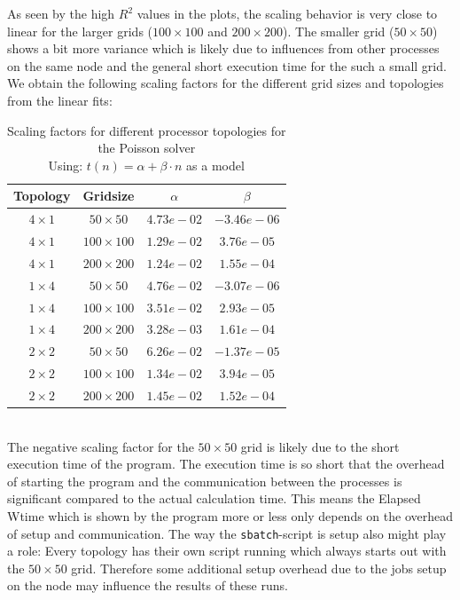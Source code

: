As seen by the high $R^2$ values in the plots, the scaling behavior is very close to linear for the larger grids ($100\times 100$ and $200\times 200$). The smaller grid ($50\times 50$) shows a bit more variance which is likely due to influences from other processes on the same node and the general short execution time for the such a small grid. 
We obtain the following scaling factors for the different grid sizes and topologies from the linear fits:
\begin{table}[H]
    \centering
    \begin{tabular}{|c|c|c|c|}
        \hline
        Topology & Gridsize & $\alpha$ & $\beta$ \\\hline
        $4\times 1$ & $50\times 50$   & $4.73e-02$ & $-3.46e-06$  \\ \hline
        $4\times 1$ & $100\times 100$ & $1.29e-02$ & $3.76e-05$   \\ \hline
        $4\times 1$ & $200\times 200$ & $1.24e-02$ & $1.55e-04$   \\ \hline
        $1\times 4$ & $50\times 50$   & $4.76e-02$ & $-3.07e-06$  \\ \hline
        $1\times 4$ & $100\times 100$ & $3.51e-02$ & $2.93e-05$   \\ \hline
        $1\times 4$ & $200\times 200$ & $3.28e-03$ & $1.61e-04$   \\ \hline
        $2\times 2$ & $50\times 50$   & $6.26e-02$ & $-1.37e-05$  \\ \hline
        $2\times 2$ & $100\times 100$ & $1.34e-02$ & $3.94e-05$   \\ \hline
        $2\times 2$ & $200\times 200$ & $1.45e-02$ & $1.52e-04$   \\ \hline
    \end{tabular}
    \caption{Scaling factors for different processor topologies for the Poisson solver\\Using: $t(n) = \alpha + \beta \cdot n$ as a model}
\end{table}
\\
The negative scaling factor for the $50\times 50$ grid is likely due to the short execution time of the program. The execution time is so short that the overhead of starting the program and the communication between the processes is significant compared to the actual calculation time. This means the Elapsed Wtime which is shown by the program more or less only depends on the overhead of setup and communication. The way the \texttt{sbatch}-script is setup also might play a role: Every topology has their own script running which always starts out with the $50\times 50$ grid. Therefore some additional setup overhead due to the jobs setup on the node may influence the results of these runs.\\
